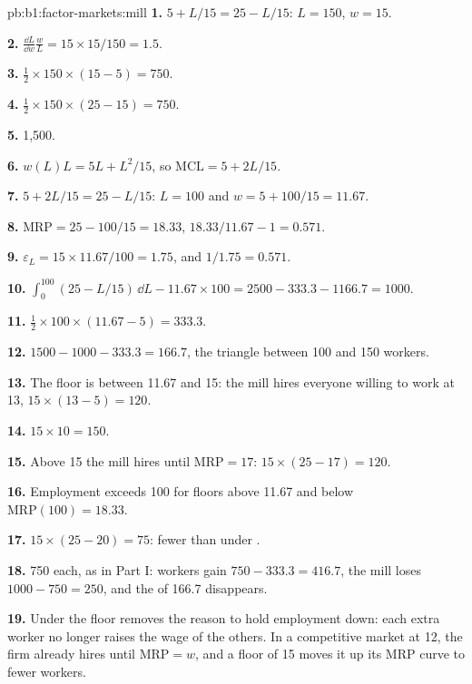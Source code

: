 \begin{solution}{pb:b1:factor-markets:mill}
\textbf{1.} $5 + L/15 = 25 - L/15$: $L = 150$, $w = 15$.

\textbf{2.} $\frac{\dd L}{\dd w}\frac wL = 15 \times 15/150 = 1.5$.

\textbf{3.} $\tfrac12 \times 150 \times (15 - 5) = 750$.

\textbf{4.} $\tfrac12 \times 150 \times (25 - 15) = 750$.

\textbf{5.} 1,500.

\textbf{6.} $w(L)L = 5L + L^2/15$, so $\mathrm{MCL} = 5 + 2L/15$.

\textbf{7.} $5 + 2L/15 = 25 - L/15$: $L = 100$ and $w = 5 + 100/15 = 11.67$.

\textbf{8.} $\mathrm{MRP} = 25 - 100/15 = 18.33$,  $18.33/11.67 - 1 = 0.571$.

\textbf{9.} $\varepsilon_L = 15 \times 11.67/100 = 1.75$, and $1/1.75 = 0.571$.

\textbf{10.} $\int_0^{100}(25 - L/15)\,\dd L - 11.67 \times 100 = 2500 - 333.3 - 1166.7 = 1000$.

\textbf{11.} $\tfrac12 \times 100 \times (11.67 - 5) = 333.3$.

\textbf{12.} $1500 - 1000 - 333.3 = 166.7$, the triangle between 100 and 150 workers.

\textbf{13.} The floor is between 11.67 and 15: the mill hires everyone willing
to work at 13, $15 \times (13 - 5) = 120$.

\textbf{14.} $15 \times 10 = 150$.

\textbf{15.} Above 15 the mill hires until $\mathrm{MRP} = 17$: $15 \times (25 - 17) = 120$.

\textbf{16.} Employment exceeds 100 for floors above 11.67 and below
$\mathrm{MRP}(100) = 18.33$.

\textbf{17.} $15 \times (25 - 20) = 75$: fewer than under .

\textbf{18.} 750 each, as in Part I: workers gain $750 - 333.3 = 416.7$, the mill loses
$1000 - 750 = 250$, and the  of 166.7 disappears.

\textbf{19.} Under  the floor removes the reason to hold
employment down: each extra worker no longer raises the wage of the
others. In a competitive market at 12, the firm already hires until
$\mathrm{MRP} = w$, and a floor of 15 moves it up its MRP curve to fewer workers.


\end{solution}
